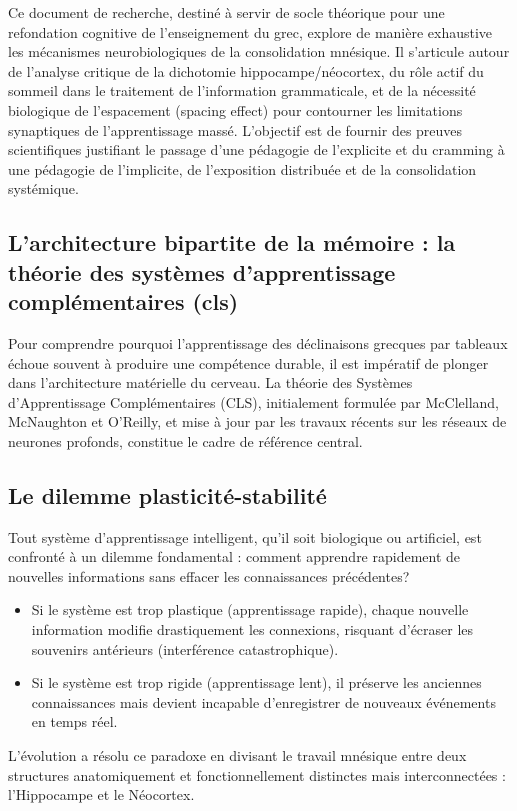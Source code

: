Ce document de recherche, destiné à servir de socle théorique pour une refondation cognitive de
l'enseignement du grec, explore de manière exhaustive les mécanismes neurobiologiques de la
consolidation mnésique. Il s'articule autour de l'analyse critique de la dichotomie
hippocampe/néocortex, du rôle actif du sommeil dans le traitement de l'information grammaticale, et
de la nécessité biologique de l'espacement (spacing effect) pour contourner les limitations
synaptiques de l'apprentissage massé. L'objectif est de fournir des preuves scientifiques justifiant
le passage d'une pédagogie de l'explicite et du \og cramming\fg{} à une pédagogie de l'implicite, de
l'exposition distribuée et de la consolidation systémique.



\subsection{L'architecture bipartite de la mémoire : la théorie des systèmes d'apprentissage complémentaires (cls)}

Pour comprendre pourquoi l'apprentissage des déclinaisons grecques par tableaux échoue souvent à
produire une compétence durable, il est impératif de plonger dans l'architecture matérielle du
cerveau. La théorie des Systèmes d'Apprentissage Complémentaires (CLS), initialement formulée par
McClelland, McNaughton et O'Reilly, et mise à jour par les travaux récents sur les réseaux de
neurones profonds, constitue le cadre de référence central.\cite{III-3-1-ref1}



\subsection{Le dilemme plasticité-stabilité}

Tout système d'apprentissage intelligent, qu'il soit biologique ou artificiel, est confronté à un
dilemme fondamental : comment apprendre rapidement de nouvelles informations sans effacer les
connaissances précédentes?

\begin{itemize}\item Si le système est trop plastique (apprentissage rapide), chaque nouvelle information modifie drastiquement les connexions, risquant d'écraser les souvenirs antérieurs (interférence catastrophique).\item Si le système est trop rigide (apprentissage lent), il préserve les anciennes connaissances mais devient incapable d'enregistrer de nouveaux événements en temps réel.\end{itemize}L'évolution a résolu ce paradoxe en divisant le travail mnésique entre deux structures
anatomiquement et fonctionnellement distinctes mais interconnectées : l'Hippocampe et le Néocortex.



